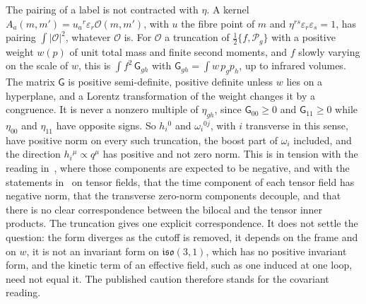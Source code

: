 The pairing of a label is not contracted with \(\eta\). A kernel \(A_a(m,m')=u_a{}^r\varepsilon_r\mathcal O(m,m')\), with \(u\) the fibre point of \(m\) and \(\eta^{rs}\varepsilon_r\varepsilon_s=1\), has pairing \(\int|\mathcal O|^2\), whatever \(\mathcal O\) is. For \(\mathcal O\) a truncation of \(\tfrac12\{f,\mathcal P_g\}\) with a positive weight \(w(p)\) of unit total mass and finite second moments, and \(f\) slowly varying on the scale of \(w\), this is \(\int f^2\,\mathsf G_{gh}\) with \(\mathsf G_{gh}=\int w\,p_gp_h\), up to infrared volumes. The matrix \(\mathsf G\) is positive semi-definite, positive definite unless \(w\) lies on a hyperplane, and a Lorentz transformation of the weight changes it by a congruence. It is never a nonzero multiple of \(\eta_{gh}\), since \(\mathsf G_{00}\ge0\) and \(\mathsf G_{11}\ge0\) while \(\eta_{00}\) and \(\eta_{11}\) have opposite signs. So \(h_i{}^0\) and \(\omega_i{}^{0j}\), with \(i\) transverse in this sense, have positive norm on every such truncation, the boost part of \(\omega_i\) included, and the direction \(h_i{}^\mu\propto q^\mu\) has positive and not zero norm. This is in tension with the reading in~\cite{FurutaHanadaKawaiKimura2007}, where those components are expected to be negative, and with the statements in~\cite{HoKawaiSteinacker2025} on tensor fields, that the time component of each tensor field has negative norm, that the transverse zero-norm components decouple, and that there is no clear correspondence between the bilocal and the tensor inner products. The truncation gives one explicit correspondence. It does not settle the question: the form diverges as the cutoff is removed, it depends on the frame and on \(w\), it is not an invariant form on \(\mathfrak{iso}(3,1)\), which has no positive invariant form, and the kinetic term of an effective field, such as one induced at one loop, need not equal it. The published caution therefore stands for the covariant reading.

